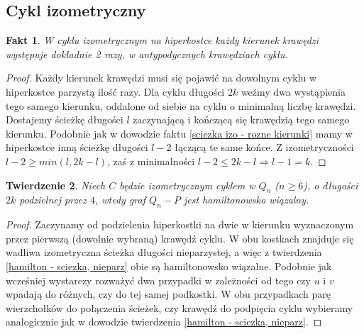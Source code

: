 \documentclass{pracamgr}
\newtheorem{theorem}{Twierdzenie}[chapter]
\newtheorem{fact}[theorem]{Fakt}
\begin{document}
   \subsection{Cykl izometryczny}
    \begin{fact}\label{cykl izometryczny - drugie pol powtorka}
     W cyklu izometrycznym na hiperkostce każdy kierunek krawędzi występuje dokładnie 2 razy, w antypodycznych krawędziach cyklu.
    \end{fact}
    \begin{proof}
     Każdy kierunek krawędzi musi się pojawić na dowolnym cyklu w hiperkostce parzystą ilość razy. Dla cyklu długości $2k$
     weźmy dwa wystąpienia tego samego kierunku, oddalone od siebie na cyklu o minimalną liczbę krawędzi. Dostajemy ścieżkę długości $l$ zaczynającą
     i kończącą się krawędzią tego samego kierunku. Podobnie jak w dowodzie faktu \ref{sciezka izo - rozne kierunki} mamy w hiperkostce
     inną ścieżkę długości $l-2$ łączącą te same końce. Z izometryczności $l-2\ge min(l,2k-l)$, zaś z minimalności $l-2\le 2k-l\Rightarrow l-1=k$.
    \end{proof}
    \begin{theorem}\label{hamilton - cykl, parz}
     Niech $C$ będzie izometrycznym cyklem w $Q_n$ ($n\ge6$), o długości $2k$ podzielnej przez $4$, wtedy graf $Q_n-P$ jest hamiltonowsko wiązalny.
    \end{theorem}
    \begin{proof}
     Zaczynamy od podzielenia hiperkostki na dwie w kierunku wyznaczonym przez pierwszą (dowolnie wybraną) krawędź cyklu.
     W obu kostkach znajduje się wadliwa izometryczna ścieżka długości nieparzystej, a więc z twierdzenia \ref{hamilton - sciezka, nieparz}
     obie są hamiltonowsko wiązalne. Podobnie jak wcześniej wystarczy rozważyć dwa przypadki w zależności od tego czy
     $u$ i $v$ wpadają do różnych, czy do tej samej podkostki. W obu przypadkach parę wierzchołków do połączenia ścieżek, czy krawędź do podpięcia
     cyklu wybieramy analogicznie jak w dowodzie twierdzenia \ref{hamilton - sciezka, nieparz}.
    \end{proof}     
\end{document}

